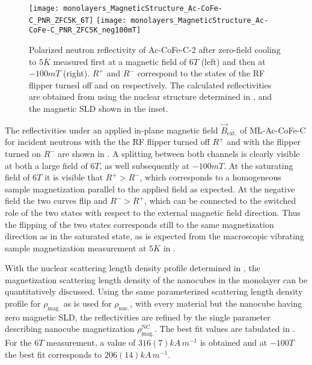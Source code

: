 \documentclass[\main/dresen_thesis.tex]{subfiles}
\begin{document}
  \begin{figure}[tb]
    \centering
    \texttt{[image: monolayers\_MagneticStructure\_Ac-CoFe-C\_PNR\_ZFC5K\_6T]}
    \texttt{[image: monolayers\_MagneticStructure\_Ac-CoFe-C\_PNR\_ZFC5K\_neg100mT]}
    \caption{\label{fig:monolayer:magneticStructure:pnr5K}Polarized neutron reflectivity of Ac-CoFe-C-2 after zero-field cooling to $5 \unit{K}$ measured first at a magnetic field of $6 \unit{T}$ (left) and then at $-100 \unit{mT}$ (right). $R^{+}$ and $R^{-}$ correspond to the states of the RF flipper turned off and on respectively. The calculated reflectivities are obtained from using the nuclear structure determined in , and the magnetic SLD shown in the inset.}
  \end{figure}
  The reflectivities under an applied in-plane magnetic field $\vec{B}_\mathrm{ext.}$ of ML-Ac-CoFe-C for incident neutrons with the the RF flipper turned off $R^{+}$ and with the flipper turned on $R^{-}$ are shown in .
  A splitting between both channels is clearly visible at both a large field of $6 \unit{T}$, as well subsequently at $-100 \unit{mT}$.
  At the saturating field of $6 \unit{T}$ it is visible that $R^{+} > R^{-}$, which corresponds to a homogeneous sample magnetization parallel to the applied field as expected.
  At the negative field the two curves flip and $R^{-} > R^{+}$, which can be connected to the switched role of the two states with respect to the external magnetic field direction.
  Thus the flipping of the two states corresponds still to the same magnetization direction as in the saturated state, as is expected from the macroscopic vibrating sample magnetization measurement at $5 \unit{K}$ in .

  With the nuclear scattering length density profile determined in , the magnetization scattering length density of the nanocubes in the monolayer can be quantitatively discussed.
  Using the same parameterized scattering length density profile for $\rho_\mathrm{mag.}$ as is used for $\rho_\mathrm{nuc.}$, with every material but the nanocube having zero magnetic SLD, the reflectivities are refined by the single parameter describing nanocube magnetization $\rho_\mathrm{mag.}^\mathrm{NC}$.
  The best fit values are tabulated in .
  For the $6 \unit{T}$ measurement, a value of $316(7) \unit{kA \, m^{-1}}$ is obtained and at $-100 \unit{T}$ the best fit corresponds to $206(14) \unit{kA \, m^{-1}}$.
\end{document}
